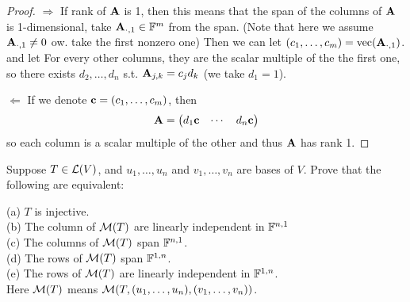 \documentclass{extarticle}
\begin{document}
\begin{proof}
\(\Rightarrow\) If rank of \(\mathbf{A}\) is 1, then this means that the span of 
the columns of \(\mathbf{A}\) is 1-dimensional, take \(\mathbf{A}_{\cdot, 1} \in \mathbb{F}^m\) from the span. 
(Note that here we assume \(\mathbf{A}_{\cdot, 1} \neq 0\) ow. take the first nonzero one)
Then we can let \((c_1, \ldots, c_m) = \text{vec}(\mathbf{A}_{\cdot, 1})\). and let 
For every other columns, they are the scalar multiple of the the first one, so 
there exists \(d_2, \ldots, d_n\) s.t. \(\mathbf{A}_{j, k}  = c_j d_k\) (we take 
\(d_1 = 1\)). 


\(\Leftarrow\) If we denote \( \mathbf{c} = (c_1, \ldots, c_m)\), then 
\[\mathbf{A} =  \begin{pmatrix}
    d_1 \mathbf{c} & \cdots & d_n \mathbf{c}
\end{pmatrix}\]
so each column is a scalar multiple of the other and thus \(\mathbf{A}\) has rank 1. 
\end{proof}

\begin{problem}{17}
    Suppose \(T \in \mathcal{L}(V)\), and \(u_1, \ldots, u_n\) and \(v_1, \ldots, v_n\) are bases of \(V\). 
    Prove that the following are equivalent:

    (a) \(T\) is injective. \\ 
    (b) The column of \(\mathcal{M}(T)\) are linearly independent in \(\mathbb{F}^{n, 1}\) \\ 
    (c) The columns of \(\mathcal{M}(T)\) span \(\mathbb{F}^{n, 1}\). \\ 
    (d) The rows of \(\mathcal{M}(T)\) span \(\mathbb{F}^{1 , n}\). \\ 
    (e) The rows of \(\mathcal{M}(T)\) are linearly independent in \(\mathbb{F}^{1, n}\). \\ 
    Here \(\mathcal{M}(T)\) means \(\mathcal{M}(T, (u_1, \ldots, u_n), (v_1, \ldots, v_n))\). 
\end{problem}
\end{document}
